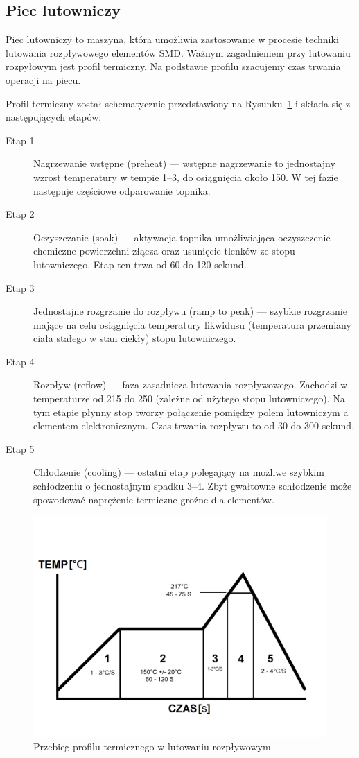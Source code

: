 \subsection{Piec lutowniczy}
Piec lutowniczy to maszyna, która umożliwia zastosowanie w procesie techniki lutowania rozpływowego elementów SMD\@. Ważnym zagadnieniem przy lutowaniu rozpyłowym jest profil termiczny. Na podstawie profilu szacujemy czas trwania operacji na piecu.

\breakparagraph{}
Profil termiczny został schematycznie przedstawiony na Rysunku~\ref{schemat_termiczny} i składa się z następujących etapów:
\begin{description}
	\item[Etap 1] Nagrzewanie wstępne (preheat) --- wstępne nagrzewanie to jednostajny wzrost temperatury w tempie 1--3, do osiągnięcia około 150. W tej fazie następuje częściowe odparowanie topnika.
	\item[Etap 2] Oczyszczanie (soak) --- aktywacja topnika umożliwiająca oczyszczenie chemiczne powierzchni złącza oraz usunięcie tlenków ze stopu lutowniczego. Etap ten trwa od 60 do 120 sekund.
	\item[Etap 3] Jednostajne rozgrzanie do rozpływu (ramp to peak) --- szybkie rozgrzanie mające na celu osiągnięcia temperatury likwidusu (temperatura przemiany ciała stałego w stan ciekły) stopu lutowniczego.
	\item[Etap 4] Rozpływ (reflow) --- faza zasadnicza lutowania rozpływowego. Zachodzi w temperaturze od 215 do 250 (zależne od użytego stopu lutowniczego). Na tym etapie płynny stop tworzy połączenie pomiędzy polem lutowniczym a elementem elektronicznym. Czas trwania rozpływu to od 30 do 300 sekund.
	\item[Etap 5] Chłodzenie (cooling) --- ostatni etap polegający na możliwe szybkim schłodzeniu o jednostajnym spadku 3--4. Zbyt gwałtowne schłodzenie może spowodować naprężenie termiczne groźne dla elementów.
\end{description}

\begin{figure}[H]
	\centering
	\includegraphics[scale=0.2]{./chapters/chapter2/schemat.png}
	\caption{Przebieg profilu termicznego w lutowaniu rozpływowym}
	\label{schemat_termiczny}
\end{figure}


